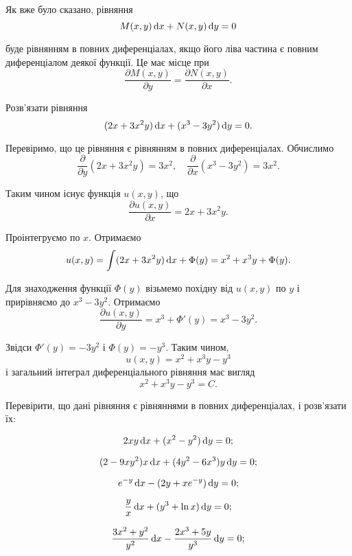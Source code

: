 Як вже було сказано, рівняння \[M(x, y) \mathop{}\!\mathrm{d} x + N(x, y) \mathop{}\!\mathrm{d} y = 0\]

 буде рівнянням в повних диференціалах, якщо його ліва частина є повним диференціалом деякої функції. Це має місце при \[\frac{\partial M(x, y)}{\partial y} = \frac{\partial N(x, y)}{\partial x}.\]

\begin{example}
	Розв'язати рівняння \[(2x + 3x^2y) \mathop{}\!\mathrm{d} x + (x^3 - 3y^2) \mathop{}\!\mathrm{d} y = 0.\]
\end{example}

\begin{solution}
	Перевіримо, що це рівняння є рівнянням в повних диференціалах. Обчислимо \[ \frac{\partial}{\partial y} (2x + 3x^2y) = 3x^2, \quad \frac{\partial}{\partial x} (x^3 - 3y^2) = 3x^2. \]
	
	Таким чином існує функція $u(x,y)$, що \[\frac{\partial u(x,y)}{\partial x} = 2x + 3x^2y.\] 
	
	Проінтегруємо по $x$. Отримаємо \[ u(x,y) = \int(2x+3x^2y)\mathop{}\!\mathrm{d} x+\Phi(y)=x^2+x^3y+\Phi(y).\]
	
	Для знаходження функції $\Phi(y)$ візьмемо похідну від $u(x,y)$ по $y$ і прирівняємо до $x^3-3y^2$. Отримаємо \[ \frac{\partial u(x,y)}{\partial y} = x^3 + \Phi'(y) = x^3 - 3y^2.\]

	Звідси $\Phi'(y) = -3y^2$ і $\Phi(y) = -y^3$. Таким чином, \[u(x,y)=x^2+x^3y-y^3\] і загальний інтеграл диференціального рівняння має вигляд \[x^2+x^3y-y^3=C.\]
\end{solution}

Перевірити, що дані рівняння є рівняннями в повних диференціалах, і роз\-в'яз\-а\-ти їх:
\begin{problem}
	\[ 2 x y \mathop{}\!\mathrm{d} x + (x^2 - y^2) \mathop{}\!\mathrm{d} y = 0;\]
\end{problem}

\begin{problem}
	\[(2-9xy^2) x \mathop{}\!\mathrm{d} x + (4y^2-6x^3) y \mathop{}\!\mathrm{d} y=0;\]
\end{problem}

\begin{problem}
	\[e^{-y}\mathop{}\!\mathrm{d} x-(2y+x e^{-y})\mathop{}\!\mathrm{d} y=0;\]
\end{problem}

\begin{problem}
	\[ \frac yx\mathop{}\!\mathrm{d} x+(y^3+\ln x)\mathop{}\!\mathrm{d} y=0;\]
\end{problem}

\begin{problem}
	\[\frac{3x^2+y^2}{y^2}\mathop{}\!\mathrm{d} x-\frac{2x^3+5y}{y^3}\mathop{}\!\mathrm{d} y=0;\]
\end{problem}

